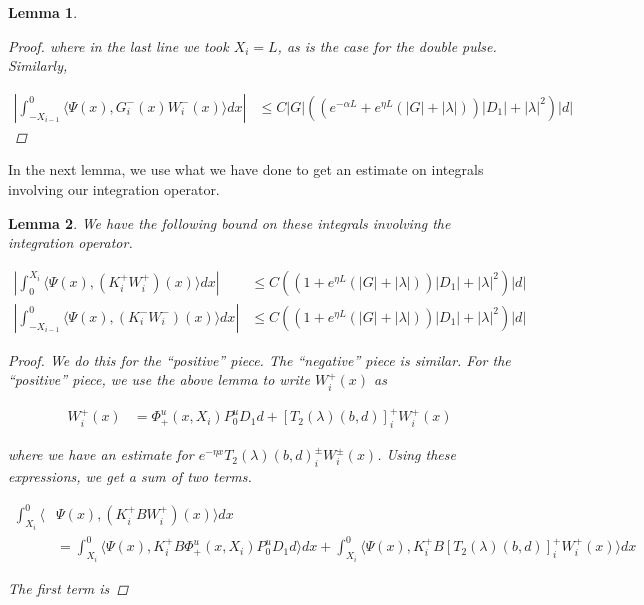 \documentclass[12pt]{article}
\newtheorem{lemma}{Lemma}
\begin{document}
\begin{lemma}
\begin{proof}
where in the last line we took $X_i = L$, as is the case for the double pulse. Similarly,

\begin{align*}
\left| \int_{-X_{i-1}}^0 \langle \Psi(x), G_i^-(x) W_i^-(x) \rangle dx \right| &\leq C|G| \left( \left( e^{-\alpha L} + e^{\eta L}(|G| + |\lambda|)  \right) |D_1| + |\lambda|^2 \right)|d|
\end{align*}

\end{proof}
\end{lemma}

In the next lemma, we use what we have done to get an estimate on integrals involving our integration operator.

\begin{lemma}
We have the following bound on these integrals involving the integration operator.

\begin{align*}
\left| \int_0^{X_i} \langle \Psi(x), (K_i^+ W_i^+)(x)\rangle dx \right| &\leq C\left((1 + e^{\eta L}(|G| + |\lambda|)) |D_1| + |\lambda|^2 \right) |d| \\
\left| \int_{-X_{i-1}}^0 \langle \Psi(x), (K_i^- W_i^-)(x)\rangle dx \right| &\leq C\left((1 + e^{\eta L}(|G| + |\lambda|)) |D_1| + |\lambda|^2 \right) |d|
\end{align*}

\begin{proof}

We do this for the ``positive'' piece. The ``negative'' piece is similar. For the ``positive'' piece, we use the above lemma to write $W_i^+(x)$ as 

\begin{align*}
W_i^+(x) &= \Phi^u_+(x, X_i) P_0^u D_1 d + [T_2(\lambda)(b,d)]_i^+ W_i^+(x)
\end{align*}

where we have an estimate for $e^{-\eta x} T_2(\lambda)(b,d)_i^\pm W_i^\pm(x)$. Using these expressions, we get a sum of two terms. 

\begin{align*}
\int_{X_i}^0 \langle &\Psi(x), (K_i^+ B W_i^+)(x)\rangle dx \\
&= \int_{X_i}^0 \langle \Psi(x), K_i^+ B\Phi^u_+(x, X_i) P_0^u D_1 d \rangle dx + \int_{X_i}^0 \langle \Psi(x), K_i^+ B[T_2(\lambda)(b,d)]_i^+ W_i^+(x) \rangle dx 
\end{align*}

The first term is


\end{proof}
\end{lemma}
\end{document}
